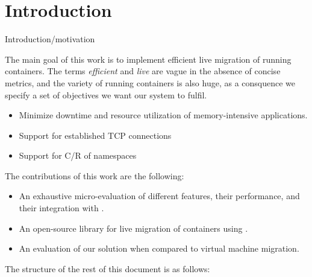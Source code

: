 \chapter{Introduction} \label{chap:introduction}

Introduction/motivation

The main goal of this work is to implement efficient live migration of running containers.
The terms \textit{efficient} and \textit{live} are vague in the absence of concise metrics, and the variety of running containers is also huge, as a consquence we specify a set of objectives we want our system to fulfil.
\begin{itemize}
    \item Minimize downtime and resource utilization of memory-intensive applications.
    \item Support for established TCP connections
    \item Support for C/R of namespaces
\end{itemize}

The contributions of this work are the following:
\begin{itemize}
    \item An exhaustive micro-evaluation of different \criu features, their performance, and their integration with \runc.
    \item An open-source library for live migration of \runc containers using \criu.
    \item An evaluation of our solution when compared to virtual machine migration.
\end{itemize}

The structure of the rest of this document is as follows:
